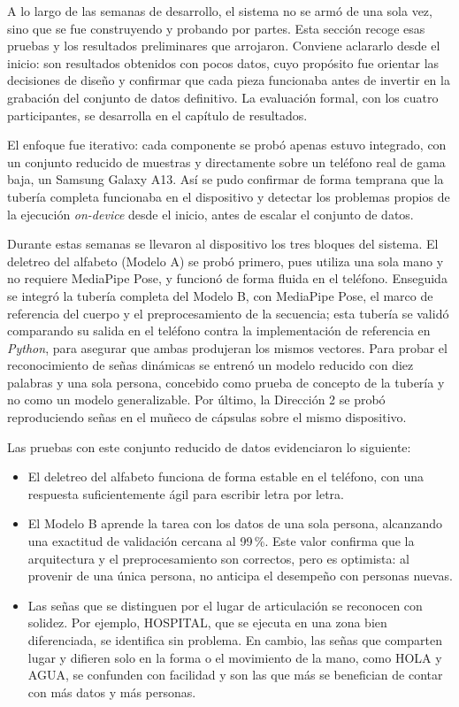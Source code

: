 A lo largo de las semanas de desarrollo, el sistema no se armó de una sola vez, sino que se
fue construyendo y probando por partes. Esta sección recoge esas pruebas y los resultados
preliminares que arrojaron. Conviene aclararlo desde el inicio: son resultados obtenidos con
pocos datos, cuyo propósito fue orientar las decisiones de diseño y confirmar que cada pieza
funcionaba antes de invertir en la grabación del conjunto de datos definitivo. La evaluación
formal, con los cuatro participantes, se desarrolla en el capítulo de resultados.

El enfoque fue iterativo: cada componente se probó apenas estuvo integrado, con un conjunto
reducido de muestras y directamente sobre un teléfono real de gama baja, un Samsung Galaxy
A13. Así se pudo confirmar de forma temprana que la tubería completa funcionaba en el
dispositivo y detectar los problemas propios de la ejecución \textit{on-device} desde el
inicio, antes de escalar el conjunto de datos.

Durante estas semanas se llevaron al dispositivo los tres bloques del sistema. El deletreo del
alfabeto (Modelo A) se probó primero, pues utiliza una sola mano y no requiere MediaPipe Pose,
y funcionó de forma fluida en el teléfono. Enseguida se integró la tubería completa del Modelo
B, con MediaPipe Pose, el marco de referencia del cuerpo y el preprocesamiento de la secuencia;
esta tubería se validó comparando su salida en el teléfono contra la implementación de
referencia en \textit{Python}, para asegurar que ambas produjeran los mismos vectores. Para
probar el reconocimiento de señas dinámicas se entrenó un modelo reducido con diez palabras y
una sola persona, concebido como prueba de concepto de la tubería y no como un modelo
generalizable. Por último, la Dirección 2 se probó reproduciendo señas en el muñeco de cápsulas
sobre el mismo dispositivo.

Las pruebas con este conjunto reducido de datos evidenciaron lo siguiente:

\begin{itemize}
    \item El deletreo del alfabeto funciona de forma estable en el teléfono, con una respuesta
    suficientemente ágil para escribir letra por letra.
    \item El Modelo B aprende la tarea con los datos de una sola persona, alcanzando una
    exactitud de validación cercana al 99\,\%. Este valor confirma que la arquitectura y el
    preprocesamiento son correctos, pero es optimista: al provenir de una única persona, no
    anticipa el desempeño con personas nuevas.
    \item Las señas que se distinguen por el lugar de articulación se reconocen con solidez.
    Por ejemplo, HOSPITAL, que se ejecuta en una zona bien diferenciada, se identifica sin
    problema. En cambio, las señas que comparten lugar y difieren solo en la forma o el
    movimiento de la mano, como HOLA y AGUA, se confunden con facilidad y son las que más se
    benefician de contar con más datos y más personas.
\end{itemize}

